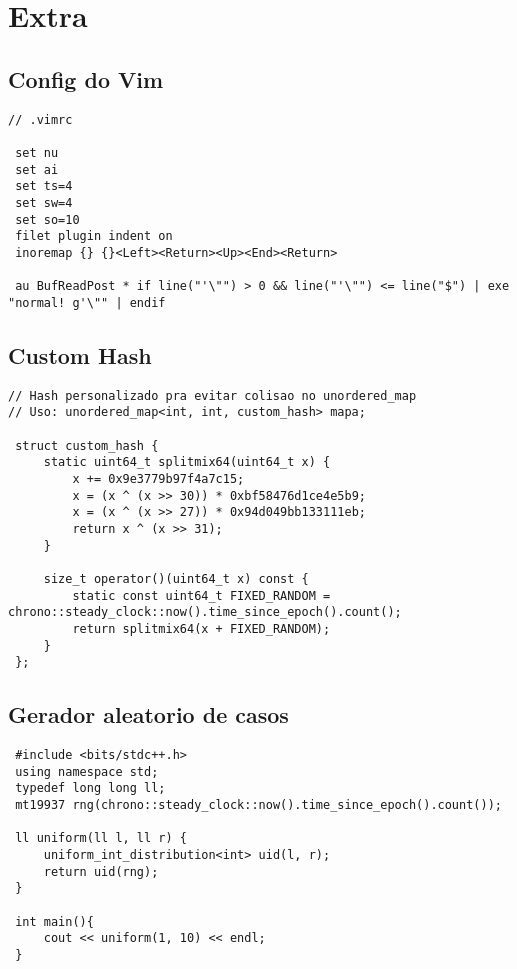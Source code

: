 \documentclass[11pt, a4paper, twoside]{article}
\begin{document}
\pagebreak


%
%

\section{Extra}

\subsection{Config do Vim}
\begin{lstlisting}
// .vimrc

 set nu
 set ai
 set ts=4
 set sw=4
 set so=10
 filet plugin indent on
 inoremap {} {}<Left><Return><Up><End><Return> 
 
 au BufReadPost * if line("'\"") > 0 && line("'\"") <= line("$") | exe "normal! g'\"" | endif
\end{lstlisting}

\subsection{Custom Hash}
\begin{lstlisting}
// Hash personalizado pra evitar colisao no unordered_map
// Uso: unordered_map<int, int, custom_hash> mapa;

 struct custom_hash {
     static uint64_t splitmix64(uint64_t x) {
         x += 0x9e3779b97f4a7c15;
         x = (x ^ (x >> 30)) * 0xbf58476d1ce4e5b9;
         x = (x ^ (x >> 27)) * 0x94d049bb133111eb;
         return x ^ (x >> 31);
     }
 
     size_t operator()(uint64_t x) const {
         static const uint64_t FIXED_RANDOM = chrono::steady_clock::now().time_since_epoch().count();
         return splitmix64(x + FIXED_RANDOM);
     }
 };
\end{lstlisting}

\subsection{Gerador aleatorio de casos}
\begin{lstlisting}
 #include <bits/stdc++.h>
 using namespace std;
 typedef long long ll;
 mt19937 rng(chrono::steady_clock::now().time_since_epoch().count());
 
 ll uniform(ll l, ll r) {
     uniform_int_distribution<int> uid(l, r);
     return uid(rng);
 }
 
 int main(){
     cout << uniform(1, 10) << endl;
 }
\end{lstlisting}
\end{document}
